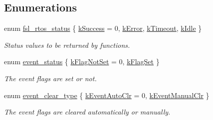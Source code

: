 \subsection*{Enumerations}
\begin{DoxyCompactItemize}
\item 
enum \hyperlink{group__os__abstraction_gaea1a100f413fd124de281c4b493e99d5}{fsl\+\_\+rtos\+\_\+status} \{ \hyperlink{group__os__abstraction_ggaea1a100f413fd124de281c4b493e99d5af0536797208144380691e2b376ffc1d1}{k\+Success} = 0, 
\hyperlink{group__os__abstraction_ggaea1a100f413fd124de281c4b493e99d5aacb2c04376333850bff6fb1065c0c171}{k\+Error}, 
\hyperlink{group__os__abstraction_ggaea1a100f413fd124de281c4b493e99d5af6eaabf6dfdfd48f5c5a024609cc2e8b}{k\+Timeout}, 
\hyperlink{group__os__abstraction_ggaea1a100f413fd124de281c4b493e99d5a19d8199da79ca4c28eb644052b08f632}{k\+Idle}
 \}\begin{DoxyCompactList}\small\item\em Status values to be returned by functions. \end{DoxyCompactList}
\item 
enum \hyperlink{group__os__abstraction_gae67760ac28a08088a73d7ccef40217e6}{event\+\_\+status} \{ \hyperlink{group__os__abstraction_ggae67760ac28a08088a73d7ccef40217e6a5ca018129ddc59444a1aa1c74d99b187}{k\+Flag\+Not\+Set} = 0, 
\hyperlink{group__os__abstraction_ggae67760ac28a08088a73d7ccef40217e6a813374046706ec985d2281b9bb138200}{k\+Flag\+Set}
 \}\begin{DoxyCompactList}\small\item\em The event flags are set or not. \end{DoxyCompactList}
\item 
enum \hyperlink{group__os__abstraction_ga083d5ac6d512ad2b2bd45651974118c3}{event\+\_\+clear\+\_\+type} \{ \hyperlink{group__os__abstraction_gga083d5ac6d512ad2b2bd45651974118c3accde3a58b1a1a4d8f43e9ad1ff65f15f}{k\+Event\+Auto\+Clr} = 0, 
\hyperlink{group__os__abstraction_gga083d5ac6d512ad2b2bd45651974118c3ae5ee2c4e06ff3860a756b9c954286077}{k\+Event\+Manual\+Clr}
 \}\begin{DoxyCompactList}\small\item\em The event flags are cleared automatically or manually. \end{DoxyCompactList}
\end{DoxyCompactItemize}
